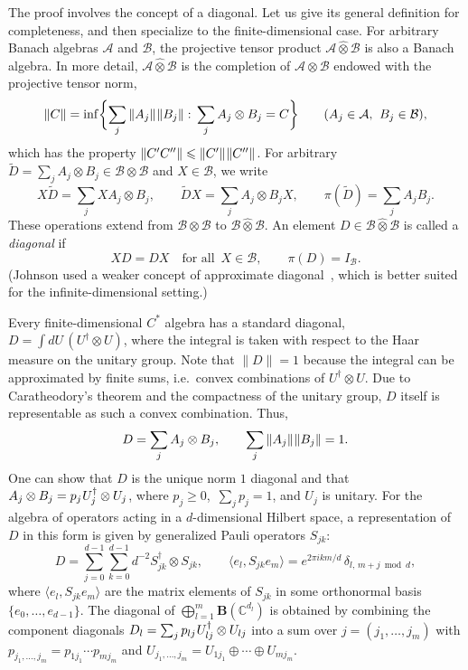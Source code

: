 \documentclass[12pt]{article}
\newcommand{\CC}{\mathbb{C}}
\newcommand{\calA}{\mathcal{A}}
\newcommand{\calB}{\mathcal{B}}
\newcommand{\ts}{\mkern1mu}
\newcommand{\hotimes}{\mathbin{\hat{\otimes}}}
\newcommand{\Bo}{\mathbf{B}}
\newcommand*{\braket}[2]{\langle{#1},{#2}\rangle}
\renewcommand{\le}{\leqslant}
\renewcommand{\ge}{\geqslant}
\newtheorem[definition]{Definition}[Theorem]{Definition}
\newtheorem[remark]{Example}[Theorem]{Example}
\newtheorem[remark]{Remark}[Theorem]{Remark}
\newtheorem[remark]{Question}[Theorem]{Open question}
\newtheorem*[definition]{definition}{Definition}
\newtheorem*[remark]{example}{Example}
\newtheorem*[remark]{remark}{Remark}
\newtheorem*[remark]{question}{Open question}
\numberwithin{equation}{section}
\begin{document}
The proof involves the concept of a diagonal. Let us give its general definition for completeness, and then specialize to the finite-dimensional case. For arbitrary Banach algebras $\calA$ and $\calB$, the projective tensor product $\calA\hotimes\calB$ is also a Banach algebra. In more detail, $\calA\hotimes\calB$ is the completion of $\calA\otimes\calB$ endowed with the projective tensor norm,
\begin{equation}
\|C\|=\inf\biggl\{\sum_{j}\|A_j\|\ts\|B_j\|:\,
\sum_{j}A_j\otimes B_j=C\biggr\}\qquad (A_j\in\calA,\,\: B_j\in\calB),
\end{equation}
which has the property $\|C'C''\|\le\|C'\|\ts\|C''\|$. For arbitrary $\tilde{D}=\sum_{j}A_j\otimes B_j\in\calB\otimes\calB$ and $X\in\calB$, we write
\begin{equation}
X\tilde{D}=\sum_{j}XA_j\otimes B_j,\qquad
\tilde{D}X=\sum_{j}A_j\otimes B_jX,\qquad
\pi(\tilde{D})=\sum_{j}A_jB_j.
\end{equation}
These operations extend from $\calB\otimes\calB$ to $\calB\hotimes\calB$. An element $D\in\calB\hotimes\calB$ is called a \emph{diagonal} if
\begin{equation}
XD=DX\quad\text{for all }\, X\in\calB,\qquad \pi(D)=I_\calB.
\end{equation}
(Johnson used a weaker concept of approximate diagonal~\cite[definition~1.1]{Joh72}, which is better suited for the infinite-dimensional setting.)

Every finite-dimensional $C^*$ algebra has a standard diagonal, $D=\int dU\, (U^\dag\otimes U)$, where the integral is taken with respect to the Haar measure on the unitary group. Note that $\|D\|=1$ because the integral can be approximated by finite sums, i.e.\ convex combinations of $U^\dag\otimes U$. Due to Caratheodory's theorem and the compactness of the unitary group, $D$ itself is representable as such a convex combination. Thus,
\begin{equation}\label{finite_diag}
D=\sum_jA_j\otimes B_j,\qquad \sum_j\|A_j\|\ts\|B_j\|=1.
\end{equation}
One can show that $D$ is the unique norm $1$ diagonal and that $A_j\otimes B_j=p_j\ts U_j^\dag\otimes U_j$, where $p_j\ge 0$,\, $\sum_jp_j=1$, and $U_j$ is unitary. For the algebra of operators acting in a $d$-dimensional Hilbert space, a representation of $D$ in this form is given by generalized Pauli operators $S_{jk}$:
\begin{equation}\label{Pauli_diag}
D=\sum_{j=0}^{d-1}\sum_{k=0}^{d-1}d^{-2}S_{jk}^\dag\otimes S_{jk},\qquad
\braket{e_l}{S_{jk}e_m}=e^{2\pi ikm/d}\,\delta_{l,\,m+j\bmod d},
\end{equation}
where $\braket{e_l}{S_{jk}e_m}$ are the matrix elements of $S_{jk}$ in some orthonormal basis $\{e_0,\dots,e_{d-1}\}$. The diagonal of $\bigoplus_{l=1}^{m}\Bo(\CC^{d_l})$ is obtained by combining the component diagonals $D_l=\sum_j p_{lj}\ts U_{lj}^\dag\otimes U_{lj}$ into a sum over $j=(j_1,\dots,j_m)$ with $p_{j_1,\dots,j_m}=p_{1j_1}\cdots p_{mj_m}$ and $U_{j_1,\dots,j_m}=U_{1j_1}\oplus\cdots\oplus U_{mj_m}$.
\end{document}
